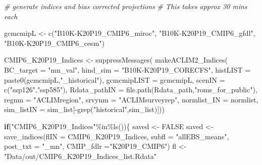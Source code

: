 \documentclass[
]{article}
\newenvironment{Shaded}{\begin{snugshade}}{\end{snugshade}}
\newcommand{\AttributeTok}[1]{\textcolor[rgb]{0.77,0.63,0.00}{#1}}
\newcommand{\CommentTok}[1]{\textcolor[rgb]{0.56,0.35,0.01}{\textit{#1}}}
\newcommand{\ConstantTok}[1]{\textcolor[rgb]{0.00,0.00,0.00}{#1}}
\newcommand{\ControlFlowTok}[1]{\textcolor[rgb]{0.13,0.29,0.53}{\textbf{#1}}}
\newcommand{\FunctionTok}[1]{\textcolor[rgb]{0.00,0.00,0.00}{#1}}
\newcommand{\NormalTok}[1]{#1}
\newcommand{\OtherTok}[1]{\textcolor[rgb]{0.56,0.35,0.01}{#1}}
\newcommand{\SpecialCharTok}[1]{\textcolor[rgb]{0.00,0.00,0.00}{#1}}
\newcommand{\StringTok}[1]{\textcolor[rgb]{0.31,0.60,0.02}{#1}}
\begin{document}
\begin{Shaded}
\begin{Highlighting}[]
    
    \CommentTok{\# generate indices and bias corrected projections }
    \CommentTok{\# This takes approx 30 mins each}
    
\NormalTok{    gcmcmipL }\OtherTok{\textless{}{-}} \FunctionTok{c}\NormalTok{(}\StringTok{"B10K{-}K20P19\_CMIP6\_miroc"}\NormalTok{,}
                  \StringTok{"B10K{-}K20P19\_CMIP6\_gfdl"}\NormalTok{,}
                  \StringTok{"B10K{-}K20P19\_CMIP6\_cesm"}\NormalTok{) }
    
\NormalTok{     CMIP6\_K20P19\_Indices }\OtherTok{\textless{}{-}} \FunctionTok{suppressMessages}\NormalTok{(}
                        \FunctionTok{makeACLIM2\_Indices}\NormalTok{(}
                        \AttributeTok{BC\_target =} \StringTok{"mn\_val"}\NormalTok{,}
                        \AttributeTok{hind\_sim  =}  \StringTok{"B10K{-}K20P19\_CORECFS"}\NormalTok{,}
                        \AttributeTok{histLIST  =} \FunctionTok{paste0}\NormalTok{(gcmcmipL,}\StringTok{"\_historical"}\NormalTok{),}
                        \AttributeTok{gcmcmipLIST =}\NormalTok{ gcmcmipL,  }
                        \AttributeTok{scenIN    =} \FunctionTok{c}\NormalTok{(}\StringTok{"ssp126"}\NormalTok{,}\StringTok{"ssp585"}\NormalTok{),}
                        \AttributeTok{Rdata\_pathIN =} \FunctionTok{file.path}\NormalTok{(Rdata\_path,}\StringTok{"roms\_for\_public"}\NormalTok{),}
                        \AttributeTok{regnm    =} \StringTok{"ACLIMregion"}\NormalTok{,}
                        \AttributeTok{srvynm    =} \StringTok{"ACLIMsurveyrep"}\NormalTok{,}
                        \AttributeTok{normlist\_IN =}\NormalTok{ normlist,}
                        \AttributeTok{sim\_listIN =}\NormalTok{ sim\_list[}\SpecialCharTok{{-}}\FunctionTok{grep}\NormalTok{(}\StringTok{"historical"}\NormalTok{,sim\_list)]))}
    
     \ControlFlowTok{if}\NormalTok{(}\StringTok{"CMIP6\_K20P19\_Indices"}\SpecialCharTok{\%in\%}\FunctionTok{ls}\NormalTok{())\{                 }
\NormalTok{      saved }\OtherTok{\textless{}{-}} \ConstantTok{FALSE}
\NormalTok{      saved }\OtherTok{\textless{}{-}} \FunctionTok{save\_indices}\NormalTok{(}\AttributeTok{flIN =}\NormalTok{ CMIP6\_K20P19\_Indices, }
                   \AttributeTok{subfl =} \StringTok{"allEBS\_means"}\NormalTok{,}
                   \AttributeTok{post\_txt =} \StringTok{"\_mn"}\NormalTok{,}
                   \AttributeTok{CMIP\_fdlr =}\StringTok{"K20P19\_CMIP6"}\NormalTok{)}
\NormalTok{      fl }\OtherTok{\textless{}{-}} \StringTok{"Data/out/CMIP6\_K20P19\_Indices\_list.Rdata"}
      

\end{Highlighting}
\end{Shaded}
\end{document}
